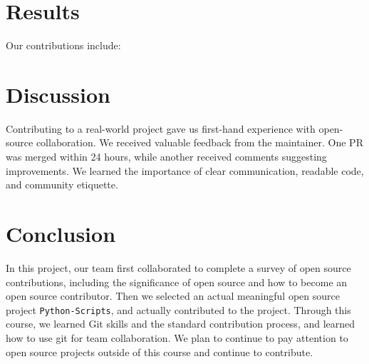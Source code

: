 \documentclass[12pt]{article}
\begin{document}
\section{Results}

Our contributions include:


\section{Discussion}

Contributing to a real-world project gave us first-hand experience with open-source collaboration. We received valuable feedback from the maintainer. One PR was merged within 24 hours, while another received comments suggesting improvements. We learned the importance of clear communication, readable code, and community etiquette.

\section{Conclusion}
In this project, our team first collaborated to complete a survey of open source contributions, including the significance of open source and how to become an open source contributor. Then we selected an actual meaningful open source project \texttt{Python-Scripts}, and actually contributed to the project. Through this course, we learned Git skills and the standard contribution process, and learned how to use git for team collaboration. We plan to continue to pay attention to open source projects outside of this course and continue to contribute.


\end{document}
